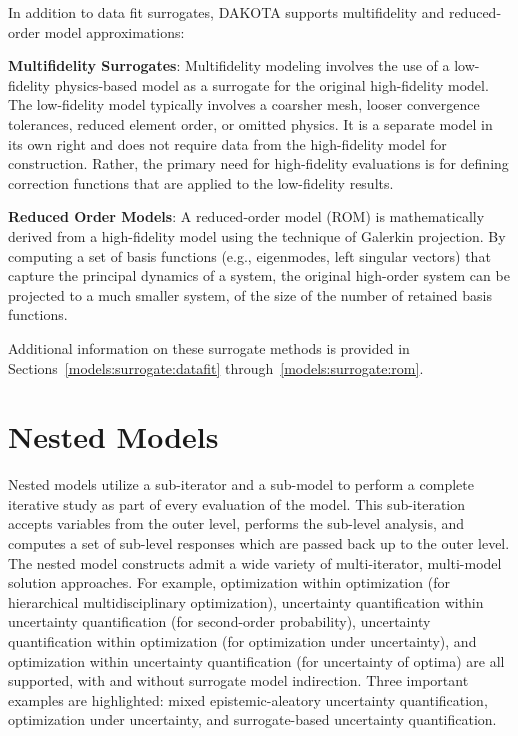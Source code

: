 In addition to data fit surrogates, DAKOTA supports multifidelity 
and reduced-order model approximations:

\textbf{Multifidelity Surrogates}: Multifidelity modeling involves the
use of a low-fidelity physics-based model as a surrogate for the
original high-fidelity model.  The low-fidelity model typically
involves a coarsher mesh, looser convergence tolerances, reduced
element order, or omitted physics.  It is a separate model in its own
right and does not require data from the high-fidelity model for
construction.  Rather, the primary need for high-fidelity evaluations
is for defining correction functions that are applied to the
low-fidelity results.

\textbf{Reduced Order Models}: A reduced-order model (ROM) is
mathematically derived from a high-fidelity model using the technique
of Galerkin projection.  By computing a set of basis functions (e.g.,
eigenmodes, left singular vectors) that capture the principal dynamics
of a system, the original high-order system can be projected to a much
smaller system, of the size of the number of retained basis functions.

Additional information on these surrogate methods is provided in
Sections~\ref{models:surrogate:datafit} through~\ref{models:surrogate:rom}.

\section{Nested Models}\label{capabilities:nested}
Nested models utilize a sub-iterator and a sub-model to perform a
complete iterative study as part of every evaluation of the model.
This sub-iteration accepts variables from the outer level, performs
the sub-level analysis, and computes a set of sub-level responses
which are passed back up to the outer level.  The nested model
constructs admit a wide variety of multi-iterator, multi-model
solution approaches.  For example, optimization within optimization
(for hierarchical multidisciplinary optimization), uncertainty
quantification within uncertainty quantification (for second-order
probability), uncertainty quantification within optimization (for
optimization under uncertainty), and optimization within uncertainty
quantification (for uncertainty of optima) are all supported, with and
without surrogate model indirection.  Three important examples are
highlighted: mixed epistemic-aleatory uncertainty quantification, 
optimization under uncertainty, and surrogate-based uncertainty quantification.

